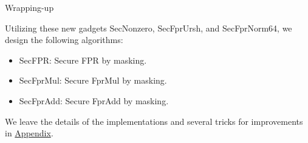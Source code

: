 \begin{frame}{Wrapping-up}

Utilizing these new gadgets {\sf SecNonzero}, {\sf SecFprUrsh}, and {\sf SecFprNorm64}, we design the following algorithms:
\pause
\begin{itemize}
	\item {\sf SecFPR}: Secure FPR by masking.
	\pause
	\item {\sf SecFprMul}: Secure FprMul by masking.
	\pause
	\item {\sf SecFprAdd}: Secure FprAdd by masking.
\end{itemize}
\pause
We leave the details of the implementations and several tricks for improvements in \hyperlink{sec:appendix}{Appendix}.

\end{frame}